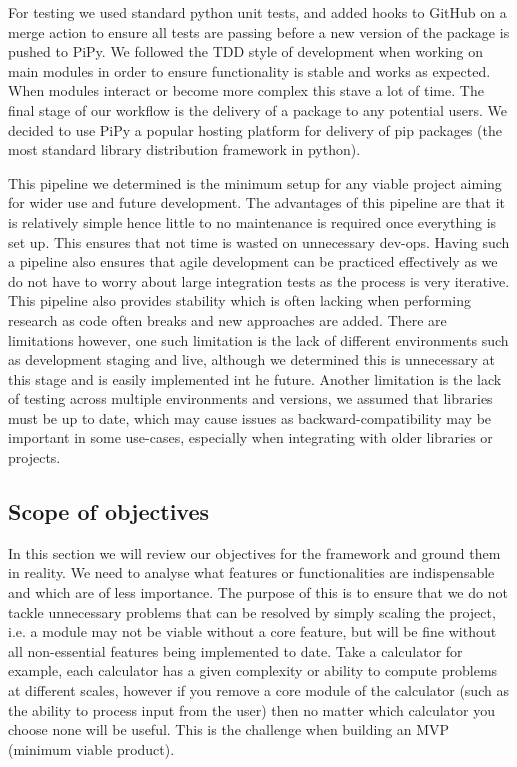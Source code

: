 For testing we used standard python unit tests, and added hooks to GitHub on a merge action to ensure all tests are passing before a new version of the package is pushed to PiPy. We followed the TDD style of development when working on main modules in order to ensure functionality is stable and works as expected. When modules interact or become more complex this stave a lot of time. The final stage of our workflow is the delivery of a package to any potential users. We decided to use PiPy a popular hosting platform for delivery of pip packages (the most standard library distribution framework in python).

This pipeline we determined is the minimum setup for any viable project aiming for wider use and future development. The advantages of this pipeline are that it is relatively simple hence little to no maintenance is required once everything is set up. This ensures that not time is wasted on unnecessary dev-ops. Having such a pipeline also ensures that agile development can be practiced effectively as we do not have to worry about large integration tests as the process is very iterative. This pipeline also provides stability which is often lacking when performing research as code often breaks and new approaches are added. There are limitations however, one such limitation is the lack of different environments such as development staging and live, although we determined this is unnecessary at this stage and is easily implemented int he future. Another limitation is the lack of testing across multiple environments and versions, we assumed that libraries must be up to date, which may cause issues as backward-compatibility may be important in some use-cases, especially when integrating with older libraries or projects.
\newpage
\subsection{Scope of objectives}
In this section we will review our objectives for the framework and ground them in reality. We need to analyse what features or functionalities are indispensable and which are of less importance. The purpose of this is to ensure that we do not tackle unnecessary problems that can be resolved by simply scaling the project, i.e. a module may not be viable without a core feature, but will be fine without all non-essential features being implemented to date. Take a calculator for example, each calculator has a given complexity or ability to compute problems at different scales, however if you remove a core module of the calculator (such as the ability to process input from the user) then no matter which calculator you choose none will be useful. This is the challenge when building an MVP (minimum viable product).

